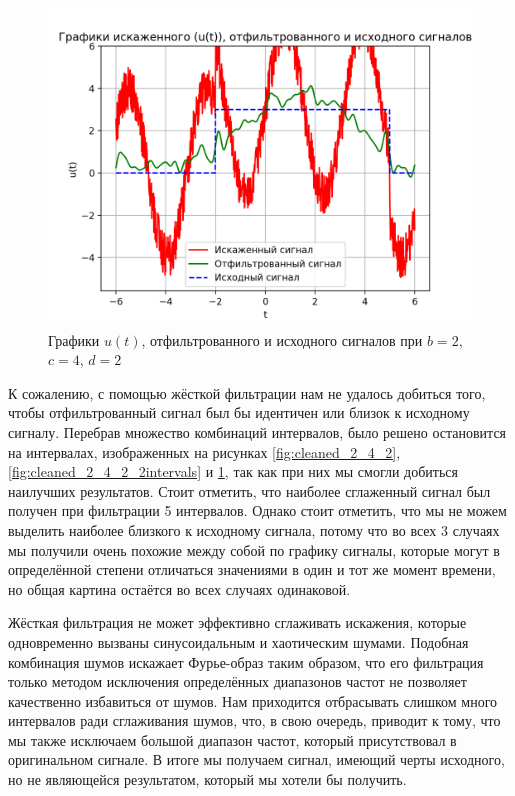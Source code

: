 \clearpage

\begin{figure}[ht!]
    \centering
    \includegraphics[scale=0.65]{media/1 task/specific_freq/Cleaned_2_4_2_-0,65:-0,153_-0,8044:-0,72_-1,3:-1,21_-2,07:-1,922_-2,67:-2,47.png}
    \caption{Графики  $u(t)$, отфильтрованного и исходного сигналов при $b=2$,  $c=4$,  $d=2$}
    \label{fig:cleaned_2_4_2_5intervals}
\end{figure}


К сожалению, с помощью жёсткой фильтрации нам не удалось добиться того, чтобы отфильтрованный сигнал был бы идентичен или близок к исходному сигналу. Перебрав множество комбинаций интервалов, было решено остановится на интервалах, изображенных на рисунках \ref{fig:cleaned_2_4_2}, \ref{fig:cleaned_2_4_2_2intervals} и \ref{fig:cleaned_2_4_2_5intervals}, так как при них мы смогли добиться наилучших результатов. Стоит отметить, что наиболее сглаженный сигнал был получен при фильтрации 5 интервалов. Однако стоит отметить, что мы не можем выделить наиболее близкого к исходному сигнала, потому что во всех 3 случаях мы получили очень похожие между собой по графику сигналы, которые могут в определённой степени отличаться значениями в один и тот же момент времени, но общая картина остаётся во всех случаях одинаковой. 

Жёсткая фильтрация не может эффективно сглаживать искажения, которые одновременно вызваны синусоидальным и хаотическим шумами. Подобная комбинация шумов искажает Фурье-образ таким образом, что его фильтрация только методом исключения определённых диапазонов частот не позволяет качественно избавиться от шумов. Нам приходится отбрасывать слишком много интервалов ради сглаживания шумов, что, в свою очередь, приводит к тому, что мы также исключаем большой диапазон частот, который присутствовал в оригинальном сигнале. В итоге мы получаем сигнал, имеющий черты исходного, но не являющейся результатом, который мы хотели бы получить.
\clearpage

